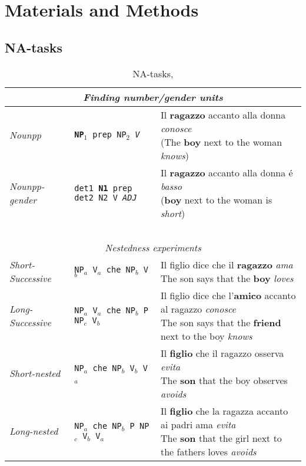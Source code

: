 \section{Materials and Methods}

\subsection{NA-tasks}

\begin{table}
    \setlength\tabcolsep{2mm}
\small
\centering
\begin{tabular}{lll}
\multicolumn{3}{c}{\centering \textit{Finding number/gender units}}\\
\hline
\hline
\emph{Nounpp} & \texttt{\textbf{NP$_1$} prep NP$_2$ \emph{V}} & \specialcell{Il \textbf{ragazzo} accanto alla donna \emph{conosce}\vspace{-3mm}\\({\scriptsize The \textbf{boy} next to the woman \emph{knows}})} \\
   \emph{Nounpp-gender} & \texttt{det1 \textbf{N1} prep det2 N2 V \emph{ADJ}} & \specialcell{Il \textbf{ragazzo} accanto alla donna \'{e} \emph{basso}\vspace{-3mm}\\({\scriptsize \textbf{boy} next to the woman is \emph{short}})}\\
~\\
\multicolumn{3}{c}{\centering \textit{Nestedness experiments}}\\
\hline
\hline
\emph{Short-Successive} & \texttt{NP$_a$ V$_a$ che NP$_b$ V$_b$} & \specialcell{Il figlio dice che il \textbf{ragazzo} \emph{ama}\vspace{-3mm}\\{\scriptsize The son says that the \textbf{boy} \emph{loves}}} \\
\emph{Long-Successive} & \texttt{NP$_a$ V$_a$ che NP$_b$ P NP$_c$ V$_b$} & \specialcell{Il figlio dice che l'\textbf{amico} accanto al ragazzo \emph{conosce}\vspace{-3mm}\\{\scriptsize The son says that the \textbf{friend} next to the boy \emph{knows}}} \\
\emph{Short-nested} & \texttt{NP$_a$ che NP$_b$ V$_b$ V$_a$ } & \specialcell{Il \textbf{figlio} che il ragazzo osserva \emph{evita}\vspace{-3mm}\\{\scriptsize The \textbf{son} that the boy observes \emph{avoids}}} \\
\emph{Long-nested} & \texttt{NP$_a$ che NP$_b$ P NP$_c$ V$_b$ V$_a$} & \specialcell{Il \textbf{figlio} che la ragazza accanto ai padri ama \emph{evita}\vspace{-3mm}\\{\scriptsize The \textbf{son} that the girl next to the fathers loves \emph{avoids}}} \\
\end{tabular}
\caption{NA-tasks, }
\end{table}

